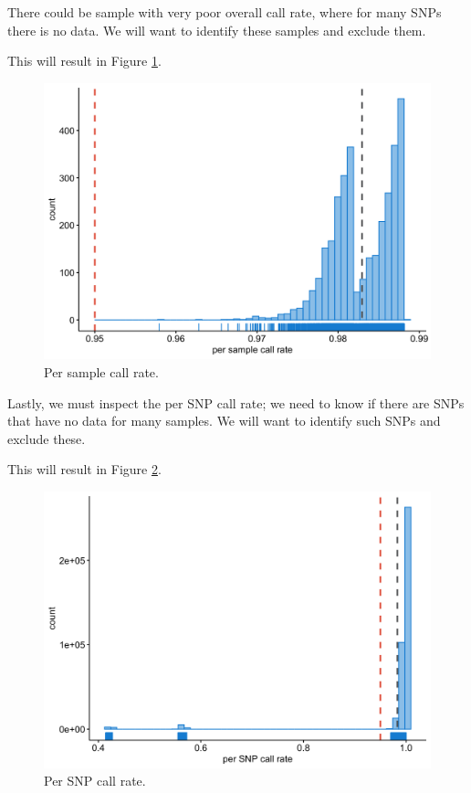 \documentclass[
]{book}
\begin{document}
There could be sample with very poor overall call rate, where for many SNPs there is no data. We will want to identify these samples and exclude them.

This will result in Figure \ref{fig:show-wtccc1-callratesample}.

\begin{figure}[H]

{\centering \includegraphics[width=0.85\linewidth]{img/_gwas_wtccc/WTCCC1-callrate-samples} 

}

\caption{Per sample call rate.}\label{fig:show-wtccc1-callratesample}
\end{figure}

Lastly, we must inspect the per SNP call rate; we need to know if there are SNPs that have no data for many samples. We will want to identify such SNPs and exclude these.

This will result in Figure \ref{fig:show-wtccc1-callratesnp}.

\begin{figure}[H]

{\centering \includegraphics[width=0.85\linewidth]{img/_gwas_wtccc/WTCCC1-callrate-SNPs} 

}

\caption{Per SNP call rate.}\label{fig:show-wtccc1-callratesnp}
\end{figure}
\end{document}

